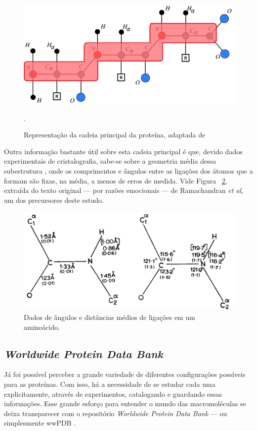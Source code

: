\documentclass[a4paper,12pt]{article}
\begin{document}
	\begin{figure}[H]
		\begin{center}
			\includegraphics[width=0.8\linewidth]{backbone.png}
		\end{center}
		\caption{Representação da cadeia principal da proteína, adaptada de  \cite{carlile:MinimalOrder}}.
		\label{fig:backbone}
	\end{figure}
	
	Outra informação bastante útil sobre esta cadeia principal é que, devido dados experimentais de cristalografia, sabe-se sobre a geometria média dessa subestrutura \cite{ramachandran1974MolStructure}, onde os comprimentos e ângulos entre  as ligações dos átomos que a formam são fixas, na média, a menos de erros de medida. Vide Figura ~\ref{fig:rama}, extraída do texto original --- por razões emocionais --- de Ramachandran \textit{et al}, um dos precursores deste estudo.
	
	\begin{figure}[H]
		\begin{center}
			\includegraphics[width=0.8\linewidth]{rama.png}
		\end{center}
		\caption{Dados de ângulos e distâncias médios de ligações em um aminoácido.}
		\label{fig:rama}
	\end{figure}
	
	
	\subsection{\textit{Worldwide Protein Data Bank}}
	Já foi possível perceber a grande variedade de diferentes configurações possíveis para as proteínas. Com isso, há a necessidade de se estudar cada uma explicitamente, através de experimentos, catalogando e guardando essas informações. Esse grande esforço para entender o mundo das macromoléculas se deixa transparecer com o repositório \textit{Worldwide Protein Data Bank} --- ou simplesmente wwPDB \cite{wwPDB}.
	
\end{document}
